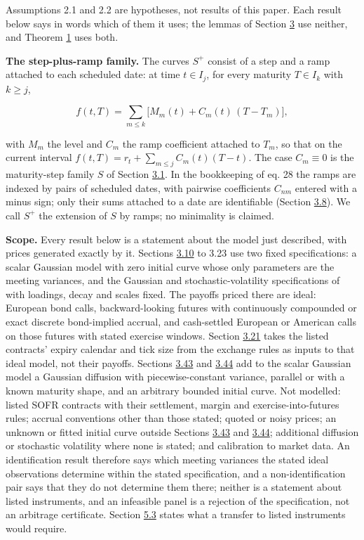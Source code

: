 \documentclass[11pt]{article}
\begin{document}
Assumptions 2.1 and 2.2 are hypotheses, not results of this paper. Each result below says in words which of them it uses; the lemmas of Section \hyperref[sec:3]{3} use neither, and Theorem \hyperref[res:Theorem-1]{1} uses both.

\textbf{The step-plus-ramp family.} The curves \(S^+\) consist of a step and a ramp attached to each scheduled date: at time \(t\in I_j\), for every maturity \(T\in I_k\) with \(k\ge j\),

\begin{equation*}
f(t,T)=\sum_{m\le k}\bigl[M_m(t)+C_m(t)\,(T-T_m)\bigr], \tag{2.5}\label{eq:2.5}
\end{equation*}

with \(M_m\) the level and \(C_m\) the ramp coefficient attached to \(T_m\), so that on the current interval \(f(t,T)=r_t+\sum_{m\le j}C_m(t)(T-t)\). The case \(C_m\equiv0\) is the maturity-step family \(S\) of Section \hyperref[sec:3.1]{3.1}. In the bookkeeping of \cite{gellert2021short} eq. 28 the ramps are indexed by pairs of scheduled dates, with pairwise coefficients \(C_{nm}\) entered with a minus sign; only their sums attached to a date are identifiable (Section \hyperref[sec:3.8]{3.8}). We call \(S^+\) the extension of \(S\) by ramps; no minimality is claimed.

\textbf{Scope.} Every result below is a statement about the model just described, with prices generated exactly by it. Sections \hyperref[sec:3.10]{3.10} to 3.23 use two fixed specifications: a scalar Gaussian model with zero initial curve whose only parameters are the meeting variances, and the Gaussian and stochastic-volatility specifications of \cite{brace2024sofr} with loadings, decay and scales fixed. The payoffs priced there are ideal: European bond calls, backward-looking futures with continuously compounded or exact discrete bond-implied accrual, and cash-settled European or American calls on those futures with stated exercise windows. Section \hyperref[sec:3.21]{3.21} takes the listed contracts' expiry calendar and tick size from the exchange rules as inputs to that ideal model, not their payoffs. Sections \hyperref[sec:3.43]{3.43} and \hyperref[sec:3.44]{3.44} add to the scalar Gaussian model a Gaussian diffusion with piecewise-constant variance, parallel or with a known maturity shape, and an arbitrary bounded initial curve. Not modelled: listed SOFR contracts with their settlement, margin and exercise-into-futures rules; accrual conventions other than those stated; quoted or noisy prices; an unknown or fitted initial curve outside Sections \hyperref[sec:3.43]{3.43} and \hyperref[sec:3.44]{3.44}; additional diffusion or stochastic volatility where none is stated; and calibration to market data. An identification result therefore says which meeting variances the stated ideal observations determine within the stated specification, and a non-identification pair says that they do not determine them there; neither is a statement about listed instruments, and an infeasible panel is a rejection of the specification, not an arbitrage certificate. Section \hyperref[sec:5.3]{5.3} states what a transfer to listed instruments would require.
\end{document}
